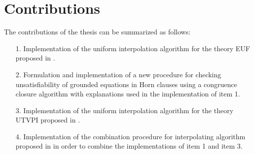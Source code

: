\section{Contributions}

The contributions of the thesis can be summarized as follows:

\begin{itemize}
  \item[1.] Implementation of the uniform 
    interpolation algorithm for the theory EUF 
    proposed in \cite{KAPUR2017}.
  \item[2.] Formulation and implementation of a new 
    procedure for checking unsatisfiability of 
    grounded equations in 
    Horn clauses using a congruence closure 
    algorithm with explanations
    used in the implementation of item 1.
  \item[3.] Implementation of the uniform 
    interpolation algorithm for the theory UTVPI
    proposed in \cite{KAPUR2017}.
  \item[4.] Implementation of the combination 
    procedure for interpolating
    algorithm proposed in 
    \cite{10.1007/11532231_26} in order to 
    combine the implementations of item 1 and item 3.
\end{itemize}

